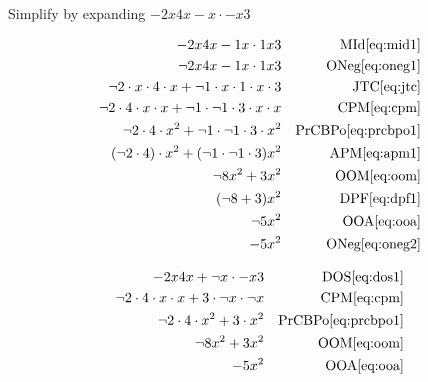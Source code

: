 \documentclass[20150903-160354-rs2.2-MarksMathNotebook.tex]{subfiles}
\begin{document}
\begin{example}[id:20141108-194709] \label{20141108-194709}  \hfill \\

Simplify by expanding $- 2x4x - x \cdot-x3$

\soln

\solnsteps
\begin{align*}
-2x4x-1x \cdot 1x3 && \text{MId} \eqref{eq:mid1} \\
\neg 2x4x-1x \cdot 1x3  && \text{ONeg} \eqref{eq:oneg1} \\
\neg 2 \cdot x \cdot 4 \cdot x + \neg 1 \cdot x \cdot 1 \cdot x \cdot 3 && \text{JTC} \eqref{eq:jtc} \\
\neg 2 \cdot 4 \cdot x \cdot x + \neg 1 \cdot \neg 1 \cdot 3 \cdot x \cdot x && \text{CPM} \eqref{eq:cpm} \\
\neg 2 \cdot 4 \cdot x^2  + \neg 1 \cdot \neg 1 \cdot 3 \cdot x^2 && \text{PrCBPo} \eqref{eq:prcbpo1} \\
(\neg 2 \cdot 4) \cdot x^2 + (\neg 1 \cdot \neg 1 \cdot 3) x^2 && \text{APM} \eqref{eq:apm1} \\
\neg 8 x^2 + 3 x^2 && \text{OOM} \eqref{eq:oom} \\
(\neg 8 + 3)x^2 && \text{DPF} \eqref{eq:dpf1} \\
\neg 5 x^2 && \text{OOA} \eqref{eq:ooa} \\
-5x^2 && \text{ONeg} \eqref{eq:oneg2}
\end{align*}

\soln

\lesssteps
\begin{align*}
- 2x4x + \neg x \cdot-x3  && \text{DOS} \eqref{eq:dos1} \\
\neg 2 \cdot 4 \cdot x \cdot x + 3 \cdot \neg x \cdot \neg x && \text{CPM} \eqref{eq:cpm} \\
\neg 2 \cdot 4 \cdot x^2 + 3 \cdot x^2 && \text{PrCBPo} \eqref{eq:prcbpo1} \\
\neg 8x^2 + 3 x^2 && \text{OOM} \eqref{eq:oom} \\
-5x^2 && \text{OOA} \eqref{eq:ooa}
\end{align*}

\end{example}
\end{document}
